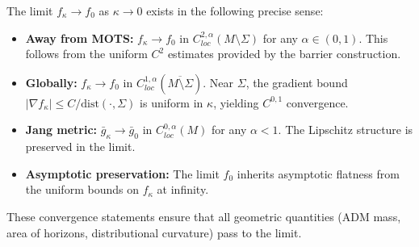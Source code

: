 \begin{theorem}
\begin{remark}\label{rem:ConvergenceTopology}
The limit $f_\kappa \to f_0$ as $\kappa \to 0$ exists in the following precise sense:
\begin{itemize}
    \item \textbf{Away from MOTS:} $f_\kappa \to f_0$ in $C^{2,\alpha}_{loc}(M \setminus \Sigma)$ for any $\alpha \in (0,1)$. This follows from the uniform $C^2$ estimates provided by the barrier construction.
    \item \textbf{Globally:} $f_\kappa \to f_0$ in $C^{1,\alpha}_{loc}(\overline{M \setminus \Sigma})$. Near $\Sigma$, the gradient bound $|\nabla f_\kappa| \le C/\text{dist}(\cdot, \Sigma)$ is uniform in $\kappa$, yielding $C^{0,1}$ convergence.
    \item \textbf{Jang metric:} $\bar{g}_\kappa \to \bar{g}_0$ in $C^{0,\alpha}_{loc}(M)$ for any $\alpha < 1$. The Lipschitz structure is preserved in the limit.
    \item \textbf{Asymptotic preservation:} The limit $f_0$ inherits asymptotic flatness from the uniform bounds on $f_\kappa$ at infinity.
\end{itemize}
These convergence statements ensure that all geometric quantities (ADM mass, area of horizons, distributional curvature) pass to the limit.
\end{remark}

\end{theorem}

